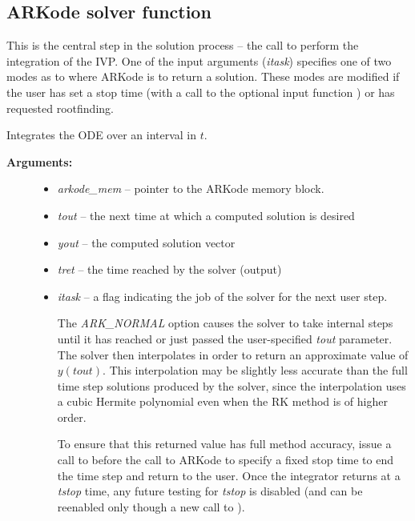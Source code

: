 \documentclass[letterpaper,10pt,english]{sphinxmanual}
\begin{document}
\subsection{ARKode solver function}
\label{c_interface/User_callable:arkode-solver-function}\label{c_interface/User_callable:cinterface-integration}
This is the central step in the solution process -- the call to perform
the integration of the IVP.  One of the input arguments (\emph{itask})
specifies one of two modes as to where ARKode is to return a
solution.  These modes are modified if the user has set a stop time
(with a call to the optional input function {\hyperref[c_interface/User_callable:ARKodeSetStopTime]{}}) or
has requested rootfinding.

\begin{fulllineitems}
\label{c_interface/User_callable:ARKode}
Integrates the ODE over an interval in $t$.
\begin{description}
\item[{\textbf{Arguments:}}] \leavevmode\begin{itemize}
\item {} 
\emph{arkode\_mem} -- pointer to the ARKode memory block.

\item {} 
\emph{tout} -- the next time at which a computed solution is desired

\item {} 
\emph{yout} -- the computed solution vector

\item {} 
\emph{tret} -- the time reached by the solver (output)

\item {} 
\emph{itask} -- a flag indicating the job of the solver for the next
user step.

The \emph{ARK\_NORMAL} option causes the solver to take internal steps
until it has reached or just passed the user-specified \emph{tout}
parameter. The solver then interpolates in order to return an
approximate value of $y(tout)$.  This interpolation may be
slightly less accurate than the full time step solutions
produced by the solver, since the interpolation uses a cubic
Hermite polynomial even when the RK method is of higher order.

To ensure that this returned value has full method accuracy,
issue a call to {\hyperref[c_interface/User_callable:ARKodeSetStopTime]{}} before the call
to ARKode to specify a fixed stop time to end the time step
and return to the user.  Once the integrator returns at a
\emph{tstop} time, any future testing for \emph{tstop} is disabled (and
can be reenabled only though a new call to
{\hyperref[c_interface/User_callable:ARKodeSetStopTime]{}}).


\end{itemize}
\end{description}
\end{fulllineitems}
\end{document}

